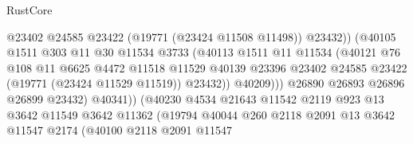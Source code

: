 \begin{lexlean}{RustCore}
\begin{coremodule}
                                        @23402
                                        @24585
                                        @23422
                                        (@19771 (@23424 @11508 @11498))
                                        @23432))
                                    (@40105
                                      @1511
                                      @303
                                      @11
                                      @30
                                      @11534
                                      @3733
                                      (@40113
                                        @1511
                                        @11
                                        @11534
                                        (@40121
                                          @76
                                          @108
                                          @11
                                          @6625
                                          @4472
                                          @11518
                                          @11529
                                          @40139
                                          @23396
                                          @23402
                                          @24585
                                          @23422
                                          (@19771 (@23424 @11529 @11519))
                                          @23432))
                                      @40209)))
                                @26890
                                @26893
                                @26896
                                @26899
                                @23432)
                              @40341))
                          (@40230
                            @4534
                            @21643
                            @11542
                            @2119
                            @923
                            @13
                            @3642
                            @11549
                            @3642
                            @11362
                            (@19794
                              @40044
                              @260
                              @2118
                              @2091
                              @13
                              @3642
                              @11547
                              @2174
                              (@40100
                                @2118
                                @2091
                                @11547

\end{coremodule}
\end{lexlean}
